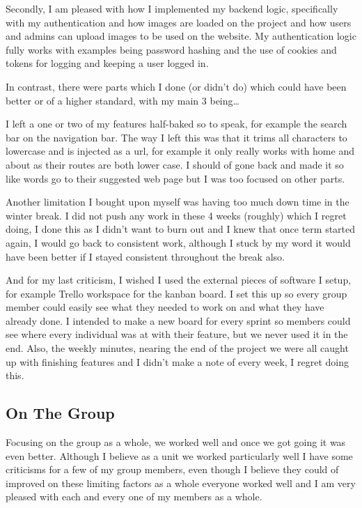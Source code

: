 \documentclass[twoside,12pt,titlepage,a4paper]{article}
\begin{document}
Secondly, I am pleased with how I implemented my backend logic, specifically with my authentication and how 
images are loaded on the project and how users and admins can upload images to be used on the website. My 
authentication logic fully works with examples being password hashing and the use of cookies and tokens for 
logging and keeping a user logged in.

In contrast, there were parts which I done (or didn’t do) which could have been better or of a higher 
standard, with my main 3 being…

I left a one or two of my features half-baked so to speak, for example the search bar on the navigation bar. 
The way I left this was that it trims all characters to lowercase and is injected as a url, for example it only
really works with home and about as their routes are both lower case. I should of gone back and made it so like
words go to their suggested web page but I was too focused on other parts.

Another limitation I bought upon myself was having too much down time in the winter break. I did not push any 
work in these 4 weeks (roughly) which I regret doing, I done this as I didn’t want to burn out and I knew that
once term started again, I would go back to consistent work, although I stuck by my word it would have been 
better if I stayed consistent throughout the break also.

And for my last criticism, I wished I used the external pieces of software I setup, for example Trello 
workspace for the kanban board. I set this up so every group member could easily see what they needed to work 
on and what they have already done. I intended to make a new board for every sprint so members could see where
every individual was at with their feature, but we never used it in the end. Also, the weekly minutes, nearing
the end of the project we were all caught up with finishing features and I didn’t make a note of every week, I
regret doing this.

\vspace*{-0.05in}
\subsection{On The Group}
\vspace*{-0.05in}
Focusing on the group as a whole, we worked well and once we got going it was even better. Although I believe 
as a unit we worked particularly well I have some criticisms for a few of my group members, even though I 
believe they could of improved on these limiting factors as a whole everyone worked well and I am very pleased
with each and every one of my members as a whole.
\end{document}
